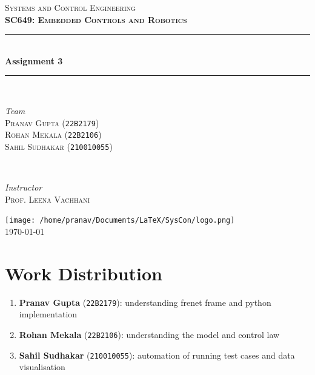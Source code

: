 \documentclass[12pt]{article}
\begin{document}
\begin{titlepage}
    \newcommand{\HRule}{\rule{\linewidth}{0.5mm}}
    \center

    \textsc{\Huge Systems and Control Engineering}\\[1.5cm]
    \textsc{\LARGE\bfseries SC649: Embedded Controls and Robotics}\\[1cm] %

    \HRule\\[0.4cm]
    {\huge\bfseries Assignment 3}\\[0.2cm] %
    \HRule\\[1.5cm]

    \begin{minipage}{0.4\textwidth}
        \begin{flushleft}
            \large
            \textit{Team}\\
            \textsc{Pranav Gupta} (\texttt{22B2179})\\
            \textsc{Rohan Mekala} (\texttt{22B2106})\\
            \textsc{Sahil Sudhakar} (\texttt{210010055})\\
        \end{flushleft}
    \end{minipage}
    ~
    \begin{minipage}{0.4\textwidth}
        \begin{flushright}
            \large
            \textit{Instructor}\\
            \textsc{Prof. Leena Vachhani}\\
        \end{flushright}
    \end{minipage}

    \vfill\vfill\vfill
    \texttt{[image: /home/pranav/Documents/LaTeX/SysCon/logo.png]}\\[1cm]

    \vfill\vfill
    {\LARGE \today}
    \vfill

\end{titlepage}

\pagebreak
\tableofcontents

\section*{Work Distribution}
\begin{enumerate}
	\item \textbf{Pranav Gupta} (\texttt{22B2179}): understanding frenet frame and python implementation
	\item \textbf{Rohan Mekala} (\texttt{22B2106}): understanding the model and control law
	\item \textbf{Sahil Sudhakar} (\texttt{210010055}): automation of running test cases and data visualisation
\end{enumerate}
\end{document}
